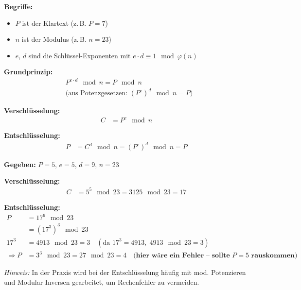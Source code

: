 \documentclass[a4paper,12pt]{article}
\begin{document}
\begin{tcolorbox}[title=Asymmetrische Verschlüsselung – RSA, colback=blue!5!white, colframe=blue!75!black]
    \textbf{Begriffe:}
    \begin{itemize}
      \item $P$ ist der Klartext (z.\,B. $P = 7$)
      \item $n$ ist der Modulus (z.\,B. $n = 23$)
      \item $e$, $d$ sind die Schlüssel-Exponenten mit $e \cdot d \equiv 1 \mod \varphi(n)$
    \end{itemize}
    
    \textbf{Grundprinzip:}
    \begin{align*}
      &P^{e \cdot d} \mod n = P \mod n \\
      &\text{(aus Potenzgesetzen: } (P^e)^d \mod n = P \text{)}
    \end{align*}
    
    \textbf{Verschlüsselung:}
    \begin{align*}
      C &= P^e \mod n
    \end{align*}
    
    \textbf{Entschlüsselung:}
    \begin{align*}
      P &= C^d \mod n = (P^e)^d \mod n = P
    \end{align*}
    \end{tcolorbox}
    
    \vspace{0.5cm}
    
    \begin{tcolorbox}[title=RSA – Beispielrechnung, colback=green!5!white, colframe=green!75!black]
    \textbf{Gegeben:} $P = 5$, $e = 5$, $d = 9$, $n = 23$
    
    \textbf{Verschlüsselung:}
    \begin{align*}
      C &= 5^5 \mod 23 = 3125 \mod 23 = 17
    \end{align*}
    
    \textbf{Entschlüsselung:}
    \begin{align*}
      P &= 17^9 \mod 23 \\
      &= (17^3)^3 \mod 23 \\
      17^3 &= 4913 \mod 23 = 3 \quad (\text{da } 17^3 = 4913, \; 4913 \mod 23 = 3) \\
      \Rightarrow P &= 3^3 \mod 23 = 27 \mod 23 = 4 \quad \textbf{(hier wäre ein Fehler – sollte $P=5$ rauskommen)}
    \end{align*}
    
    \textit{Hinweis:} In der Praxis wird bei der Entschlüsselung häufig mit mod. Potenzieren und Modular Inversen gearbeitet, um Rechenfehler zu vermeiden.
    \end{tcolorbox}
\end{document}
